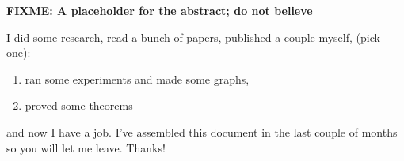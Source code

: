 \textbf{FIXME:  A placeholder for the abstract; do not believe}


I did some research, read a bunch of papers, published a couple myself, (pick one):
\begin{enumerate}
	\item ran some experiments and made some graphs,
	\item proved some theorems
\end{enumerate}
and now I have a job.  I've assembled this document in the last couple of months so you will let me leave.  Thanks!

